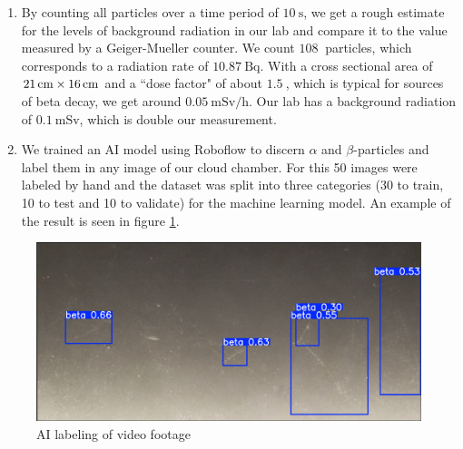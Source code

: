 \documentclass[10pt,a4paper]{article}
\begin{document}
\begin{enumerate}
    \item By counting all particles over a time period of  \(\qty{10}{\second}\), we get a rough estimate for the levels of background radiation in our lab and compare it to the value measured by a Geiger-Mueller counter. We count  \(\qty{108}{}\) particles, which corresponds to a radiation rate of \(\qty{10.87}{\becquerel }\). With a cross sectional area of \(\qtyproduct{21 x 16}{\centi\meter}\) and a “dose factor" of about \(\qty{1.5}{}\), which is typical for sources of beta decay, we get around \(\qty{0.05}{\milli\sievert\per\hour}\). Our lab has a background radiation of \(\qty{0.1}{\milli\sievert}\), which is double our measurement.
    
    \item We trained an AI model using Roboflow to discern $\alpha$ and $\beta$-particles and label them in any image of our cloud chamber. For this 50 images were labeled by hand and the dataset was split into three categories (30 to train, 10 to test and 10 to validate) for the machine learning model. An example of the result is seen in figure \ref{fig:ai}.
\end{enumerate}

\begin{figure}[H]
    \centering
    \includegraphics[width=0.5\linewidth]{images/ai labeling.jpg}
    \caption{AI labeling of video footage}
    \label{fig:ai}
\end{figure}
\end{document}
